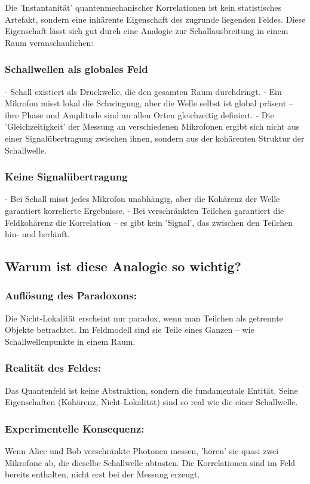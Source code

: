 \documentclass[12pt,a4paper]{article}
\begin{document}
Die 'Instantanität' quantenmechanischer Korrelationen ist kein statistisches Artefakt, sondern eine inhärente Eigenschaft des zugrunde liegenden Feldes. Diese Eigenschaft lässt sich gut durch eine Analogie zur Schallausbreitung in einem Raum veranschaulichen:

\subsubsection{Schallwellen als globales Feld}
- Schall existiert als Druckwelle, die den gesamten Raum durchdringt.
- Ein Mikrofon misst lokal die Schwingung, aber die Welle selbst ist global präsent – ihre Phase und Amplitude sind an allen Orten gleichzeitig definiert.
- Die 'Gleichzeitigkeit' der Messung an verschiedenen Mikrofonen ergibt sich nicht aus einer Signalübertragung zwischen ihnen, sondern aus der kohärenten Struktur der Schallwelle.

\subsubsection{Keine Signalübertragung}
- Bei Schall misst jedes Mikrofon unabhängig, aber die Kohärenz der Welle garantiert korrelierte Ergebnisse.
- Bei verschränkten Teilchen garantiert die Feldkohärenz die Korrelation – es gibt kein 'Signal', das zwischen den Teilchen hin- und herläuft.

\subsection{Warum ist diese Analogie so wichtig?}
\subsubsection{Auflösung des Paradoxons:}  
  Die Nicht-Lokalität erscheint nur paradox, wenn man Teilchen als getrennte Objekte betrachtet. Im Feldmodell sind sie Teile eines Ganzen – wie Schallwellenpunkte in einem Raum.

\subsubsection{Realität des Feldes:}  
  Das Quantenfeld ist keine Abstraktion, sondern die fundamentale Entität. Seine Eigenschaften (Kohärenz, Nicht-Lokalität) sind so real wie die einer Schallwelle.

\subsubsection{Experimentelle Konsequenz: } 
  Wenn Alice und Bob verschränkte Photonen messen, 'hören' sie quasi zwei Mikrofone ab, die dieselbe Schallwelle abtasten. Die Korrelationen sind im Feld bereits enthalten, nicht erst bei der Messung erzeugt.
\end{document}
